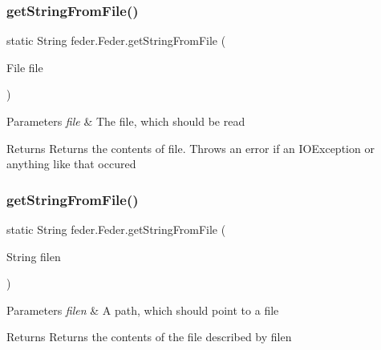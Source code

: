 \subsubsection{\texorpdfstring{get\+String\+From\+File()}{getStringFromFile()}\hspace{0.1cm}{\footnotesize\ttfamily [1/2]}}
{\footnotesize\ttfamily static String feder.\+Feder.\+get\+String\+From\+File (\begin{DoxyParamCaption}\item[{File}]{file }\end{DoxyParamCaption})\hspace{0.3cm}{\ttfamily [static]}}


\begin{DoxyParams}{Parameters}
{\em file} & The file, which should be read \\
\hline
\end{DoxyParams}
\begin{DoxyReturn}{Returns}
Returns the contents of file. Throws an error if an I\+O\+Exception or anything like that occured 
\end{DoxyReturn}
\mbox{\label{classfeder_1_1Feder_aa2c0ca836770cd11575122b9295c6b9b}} 
\subsubsection{\texorpdfstring{get\+String\+From\+File()}{getStringFromFile()}\hspace{0.1cm}{\footnotesize\ttfamily [2/2]}}
{\footnotesize\ttfamily static String feder.\+Feder.\+get\+String\+From\+File (\begin{DoxyParamCaption}\item[{String}]{filen }\end{DoxyParamCaption})\hspace{0.3cm}{\ttfamily [static]}}


\begin{DoxyParams}{Parameters}
{\em filen} & A path, which should point to a file \\
\hline
\end{DoxyParams}
\begin{DoxyReturn}{Returns}
Returns the contents of the file described by filen 
\end{DoxyReturn}
\mbox{\label{classfeder_1_1Feder_a360b544d8dba874e9598deee40d365b9}} 
